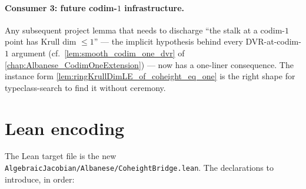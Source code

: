 \paragraph{Consumer 3: future codim-\(1\) infrastructure.} Any subsequent
project lemma that needs to discharge ``the stalk at a codim-\(1\) point has
Krull dim \(\leq 1\)'' --- the implicit hypothesis behind every DVR-at-codim-\(1\)
argument (cf.\ \cref{lem:smooth_codim_one_dvr} of
\cref{chap:Albanese_CodimOneExtension}) --- now has a one-liner consequence.
The instance form
\cref{lem:ringKrullDimLE_of_coheight_eq_one} is the right shape for
typeclass-search to find it without ceremony.

\section{Lean encoding}
\label{sec:coheight_lean_encoding}

The Lean target file is the new
\texttt{AlgebraicJacobian/Albanese/CoheightBridge.lean}. The declarations to
introduce, in order:

